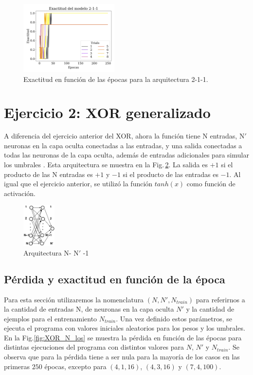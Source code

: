 \begin{figure}[H]
	\centering
	\includegraphics[width=0.44\textwidth]{../Graficos/ejer_1_2-1-1_acc.png}
	\caption{Exactitud en función de las épocas para la arquitectura 2-1-1.}
	\label{fig:XOR_acc_211}
\end{figure}


\section*{Ejercicio 2: XOR generalizado}

A diferencia del ejercicio anterior del XOR, ahora la función tiene N entradas, N$'$ neuronas en la capa oculta conectadas a las entradas, y una salida conectadas a todas las neuronas de la capa oculta, además de entradas adicionales para simular los umbrales . Esta arquitectura se muestra en la Fig.\,\ref{fig:arq-NN1}. La salida es $+1$ si el producto de las N entradas es $+1$ y $-1$ si el producto de las entradas es $-1$. Al igual que el ejercicio anterior, se utilizó la función $tanh(x)$ como función de activación.

\begin{figure}[H]
	\centering
	\includegraphics[width=0.15\textwidth]{ejer_2_NN1.png}
	\caption{Arquitectura N- N$'$ -1}
	\label{fig:arq-NN1}
\end{figure}

\subsection*{Pérdida y exactitud en función de la época}

Para esta sección utilizaremos la nomenclatura $(N, N', N_{train})$ para referirnos a la cantidad de entradas N, de neuronas en la capa oculta $N'$ y la cantidad de ejemplos para el entrenamiento $N_{train}$. Una vez definido estos parámetros, se ejecuta el programa con valores iniciales aleatorios para los pesos y los umbrales. En la Fig.\ref{fig:XOR_N_los} se muestra la pérdida en función de las épocas para distintas ejecuciones del programa con distintos valores para $N$, $N'$ y $N_{train}$. Se observa que para la pérdida tiene a ser nula para la mayoría de los casos en las primeras $250$ épocas, excepto para $(4,1,16)$, $(4,3,16)$ y $(7,4,100)$.

